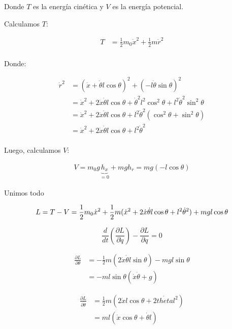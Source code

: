 \documentclass[11pt]{article}
\begin{document}
Donde $T$ es la energía cinética y $V$ es la energía potencial.

Calculamos $T$:

\begin{align*}
  T &= \frac{1}{2} m_0 \dot{x}^2 + \frac{1}{2} m \dot{r}^2 \\
\end{align*}

Donde: 

\begin{align*}
  \dot{r}^2 &= (\dot{x} + \dot{\theta} l \cos \theta)^2 + (-l \dot{\theta} \sin \theta)^2 \\
            &= \dot{x}^2 + 2 \dot{x}  \dot{\theta} l \cos \theta + \dot{\theta}^2 l^2 \cos^2 \theta
            + l^2 \dot{\theta}^2 \sin^2 \theta \\
            &= \dot{x}^2 + 2 \dot{x}  \dot{\theta} l \cos \theta + l^2 \dot{\theta}^2 (\cos^2 \theta + \sin^2 \theta) \\
            &= \dot{x}^2 + 2 \dot{x}  \dot{\theta} l \cos \theta + l^2 \dot{\theta}^2 \\
\end{align*}

Luego, calculamos $V$:

\begin{align*}
  V = m_0 g \underbrace{h_{x}}_{= 0} + m g h_{r} = m g (-l \cos \theta)
\end{align*}

Unimos todo

\begin{equation*}
  L = T - V = \frac{1}{2} m_0 \dot{x}^2 +
    \frac{1}{2} m (\dot{x}^2 + 2 \dot{x}  \dot{\theta} l \cos \theta + l^2 \dot{\theta}^2)
    + m g l \cos \theta \\
\end{equation*}

\begin{equation*}
  \frac{d}{dt} (\frac{\partial L}{\partial \dot{q}}) - \frac{\partial L}{\partial q} = 0
\end{equation*}

\begin{align*}
  \frac{\partial L}{\partial \theta} &= -\frac{1}{2}m(2 \dot{x}  \dot{\theta} l \sin \theta)
    - m g l \sin \theta \\
    &= -ml\sin \theta (\dot{x} \dot{\theta} + g)
\end{align*}

\begin{align*}
  \frac{\partial L}{\partial \dot{\theta}} &= \frac{1}{2}m (2 \dot{x} l \cos \theta 
    + 2\dot{theta} l^2) \\
    &= ml(\dot{x} \cos \theta + \dot{\theta} l)
\end{align*}
\end{document}
